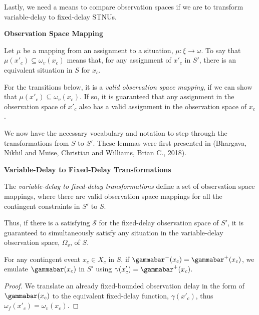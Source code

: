 \documentclass[11pt]{article}
\begin{document}
Lastly, we need a means to compare observation spaces if we are to transform variable-delay to
fixed-delay STNUs.

\begin{defn}
\textbf{Observation Space Mapping}

Let \(\mu\) be a mapping from an assignment to a situation, \(\mu : \xi \rightarrow \omega\). To say
that \(\mu(x'_{c}) \subseteq \omega_{v}(x_{c})\) means that, for any assignment of \(x'_{c}\) in \(S'\),
there is an equivalent situation in \(S\) for \(x_{c}\).
\end{defn}

For the transitions below, it is a \emph{valid observation space mapping}, if we can show that
\(\mu(x'_{c}) \subseteq \omega_{v}(x_{c})\). If so, it is guaranteed that any assignment in the
observation space of \(x'_{c}\) also has a valid assignment in the observation space of \(x_{c}\).

We now have the necessary vocabulary and notation to step through the transformations from \(S\) to
\(S'\). These lemmas were first presented in (Bhargava, Nikhil and Muise, Christian and Williams, Brian C., 2018).

\begin{defn}
\textbf{Variable-Delay to Fixed-Delay Transformations}

The \emph{variable-delay to fixed-delay transformations} define a set of observation space mappings,
where there are valid observation space mappings for all the contingent constraints in \(S'\) to \(S\).
\end{defn}

Thus, if there is a satisfying \(\mathcal{S}\) for the fixed-delay observation space of \(S'\), it is guaranteed to
simultaneously satisfy any situation in the variable-delay observation space, \(\Omega_{v}\), of \(S\).

\begin{lemma}
\label{lemma:emulating-fixed}
For any contingent event \(x_c \in X_c\) in \(S\), if \(\gammabar^-(x_c) = \gammabar^+(x_c)\), we emulate
\(\gammabar(x_c)\) in \(S'\) using \(\gamma(x'_c) = \gammabar^+(x_c)\).
\end{lemma}

\begin{proof}
We translate an already fixed-bounded observation delay in the form of \(\gammabar(x_{c})\) to the
equivalent fixed-delay function, \(\gamma(x'_{c})\), thus \(\omega_{f}(x'_{c}) = \omega_{v}(x_{c})\).
\end{proof}
\end{document}
